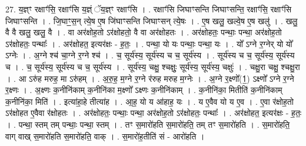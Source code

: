 \documentclass[17pt]{extarticle}
\begin{document}
27. य॒ज्ञ्ꣳ रक्षाꣳ॑सि॒ रक्षाꣳ॑सि य॒ज्ञ्ं ॅय॒ज्ञ्ꣳ रक्षाꣳ॑सि । . रक्षाꣳ॑सि जिघाꣳसन्ति जिघाꣳसन्ति॒ रक्षाꣳ॑सि॒ रक्षाꣳ॑सि जिघाꣳसन्ति । . जि॒घाꣳ॒॒स॒न् त्ये॒ष ए॒ष जि॑घाꣳसन्ति जिघाꣳसन् त्ये॒षः । . ए॒ष खलु॒ खल्वे॒ष ए॒ष खलु॑ । . खलु॒ वै वै खलु॒ खलु॒ वै । . वा अर॑क्षोह॒तो ऽर॑क्षोहतो॒ वै वा अर॑क्षोहतः । . अर॑क्षोहतः॒ पन्थाः॒ पन्था॒ अर॑क्षोह॒तो ऽर॑क्षोहतः॒ पन्थाः᳚ । . अर॑क्षोहत॒ इत्यर॑क्षः - ह॒तः॒ । . पन्था॒ यो यः पन्थाः॒ पन्था॒ यः । . यो᳚ ऽग्ने र॒ग्नेर् यो यो᳚ ऽग्नेः । . अ॒ग्ने श्च॑ चा॒ग्ने र॒ग्ने श्च॑ । . च॒ सूर्य॑स्य॒ सूर्य॑स्य च च॒ सूर्य॑स्य । . सूर्य॑स्य च च॒ सूर्य॑स्य॒ सूर्य॑स्य च । . च॒ सूर्य॑स्य॒ सूर्य॑स्य च च॒ सूर्य॑स्य । . सूर्य॑स्य॒ चक्षु॒ श्चक्षुः॒ सूर्य॑स्य॒ सूर्य॑स्य॒ चक्षुः॑ । . चक्षु॒रा चक्षु॒ श्चक्षु॒रा । . आ ऽरु॑ह मरुह॒ मा ऽरु॑हम् । . अ॒रु॒ह॒ म॒ग्ने र॒ग्ने र॑रुह मरुह म॒ग्नेः । . अ॒ग्ने र॒क्ष्णो᳚(1॒) ऽक्ष्णो᳚ ऽग्ने र॒ग्ने र॒क्ष्णः । . अ॒क्ष्णः क॒नीनि॑काम् क॒नीनि॑का म॒क्ष्णो᳚ ऽक्ष्णः क॒नीनि॑काम् । . क॒नीनि॑का॒ मितीति॑ क॒नीनि॑काम् क॒नीनि॑का॒ मिति॑ । . इत्या॑हा॒हे तीत्या॑ह । . आ॒ह॒ यो य आ॑हाह॒ यः । . य ए॒वैव यो य ए॒व । . ए॒वा र॑क्षोह॒तो ऽर॑क्षोहत ए॒वैवा र॑क्षोहतः । . अर॑क्षोहतः॒ पन्थाः॒ पन्था॒ अर॑क्षोह॒तो ऽर॑क्षोहतः॒ पन्थाः᳚ । . अर॑क्षोहत॒ इत्यर॑क्षः - ह॒तः॒ । . पन्था॒ स्तम् तम् पन्थाः॒ पन्था॒ स्तम् । . तꣳ स॒मारो॑हति स॒मारो॑हति॒ तम् तꣳ स॒मारो॑हति । . स॒मारो॑हति॒ वाग् वाख् स॒मारो॑हति स॒मारो॑हति॒ वाक् । . स॒मारो॑ह॒तीति॑ सं - आरो॑हति । \newline
\end{document}
